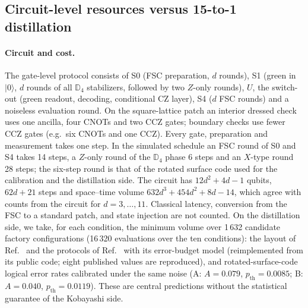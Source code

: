 \documentclass[a4paper]{article}
\providecommand{\ket}[1]{\ensuremath{|#1\rangle}}
\begin{document}
\subsection{Circuit-level resources versus 15-to-1 distillation}
\label{sec:res3}

\paragraph{Circuit and cost.}
The gate-level protocol consists of S0 (FSC preparation, $d$ rounds), S1 (green in $\ket0$, $d$ rounds of all $\mathbb{D}_4$ stabilizers, followed by two $Z$-only rounds), $U$, the switch-out (green readout, decoding, conditional CZ layer), S4 ($d$ FSC rounds) and a noiseless evaluation round. On the square-lattice patch an interior dressed check uses one ancilla, four CNOTs and two CCZ gates; boundary checks use fewer CCZ gates (e.g.\ six CNOTs and one CCZ). Every gate, preparation and measurement takes one step. In the simulated schedule an FSC round of S0 and S4 takes 14 steps, a $Z$-only round of the $\mathbb{D}_4$ phase 6 steps and an $X$-type round 28 steps; the six-step round is that of the rotated surface code used for the calibration and the distillation side. The circuit has $12d^2+4d-1$ qubits, $62d+21$ steps and space--time volume $632d^3+454d^2+8d-14$, which agree with counts from the circuit for $d=3,\dots,11$. Classical latency, conversion from the FSC to a standard patch, and state injection are not counted. On the distillation side, we take, for each condition, the minimum volume over 1\,632 candidate factory configurations (16\,320 evaluations over the ten conditions): the layout of Ref.~\cite{litinski2019game} and the protocols of Ref.~\cite{litinski2019magic} with its error-budget model (reimplemented from its public code; eight published values are reproduced), and rotated-surface-code logical error rates calibrated under the same noise (A: $A=0.079$, $p_{\mathrm{th}}=0.0085$; B: $A=0.040$, $p_{\mathrm{th}}=0.0119$). These are central predictions without the statistical guarantee of the Kobayashi side.
\end{document}
